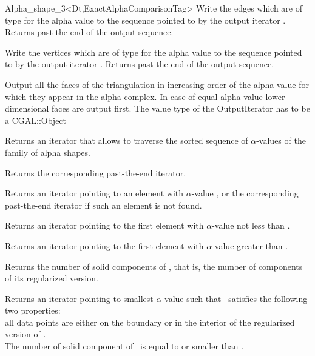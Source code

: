 \begin{ccRefClass} {Alpha_shape_3<Dt,ExactAlphaComparisonTag>}
{Write the edges which are of type  for 
the alpha value  to the sequence
pointed to by the output iterator . Returns past the end
of the output sequence.}

{Write the vertices which are of type  for 
the alpha value  to the sequence
pointed to by the output iterator . Returns past the end
of the output sequence.}

{Output all the faces  of the triangulation
in increasing order of  the alpha value for which they appear
in the alpha complex. In case of equal alpha value
lower dimensional faces are output first.
The value type of the OutputIterator has to be a  CGAL::Object}



{Returns an iterator that allows to traverse the
sorted sequence of $\alpha$-values of the family of alpha shapes.}

{Returns the corresponding past-the-end iterator.}

{Returns an iterator pointing to an element with $\alpha$-value
, or the corresponding past-the-end iterator if such 
an element is not found.}

{Returns an iterator pointing to the first element with
$\alpha$-value not less than .}

{Returns an iterator pointing to the first element with $\alpha$-value
greater than .}


{Returns the number of solid components of \ccVar, that is, the number of
components of its 
regularized version.}

{Returns an iterator pointing to smallest $\alpha$ value
such that \ccVar\ satisfies the following two properties:\\
all data points are either on the boundary or in the interior 
of the regularized version of \ccVar. \\
The number of solid component of \ccVar\  is  equal to or
smaller than .}


\end{ccRefClass}
